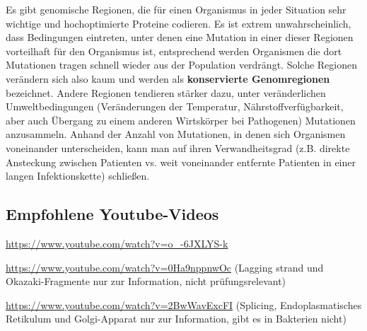 Es gibt genomische Regionen, die für einen Organismus in jeder Situation sehr wichtige und hochoptimierte Proteine codieren. Es ist extrem unwahrscheinlich, dass Bedingungen eintreten, unter denen eine Mutation in einer dieser Regionen vorteilhaft für den Organismus ist, entsprechend werden Organismen die dort Mutationen tragen schnell wieder aus der Population verdrängt. Solche Regionen verändern sich also kaum und werden als \textbf{konservierte Genomregionen} bezeichnet. Andere Regionen tendieren stärker dazu, unter veränderlichen Umweltbedingungen (Veränderungen der Temperatur, Nährstoffverfügbarkeit, aber auch Übergang zu einem anderen Wirtskörper bei Pathogenen) Mutationen anzusammeln. Anhand der Anzahl von Mutationen, in denen sich Organismen voneinander unterscheiden, kann man auf ihren Verwandheitsgrad (z.B. direkte Ansteckung zwischen Patienten vs. weit voneinander entfernte Patienten in einer langen Infektionskette) schließen.

\subsection{Empfohlene Youtube-Videos}
\begin{description}[align=left]
	\item [DNA-Struktur] \href{https://www.youtube.com/watch?v=o\_-6JXLYS-k}{https://www.youtube.com/watch?v=o\_-6JXLYS-k}
	\item [DNA-Replikation] \href{https://www.youtube.com/watch?v=0Ha9nppnwOc}{https://www.youtube.com/watch?v=0Ha9nppnwOc} (Lagging strand und Okazaki-Fragmente nur zur Information, nicht prüfungsrelevant)
	\item [Transkription und Translation] \href{https://www.youtube.com/watch?v=2BwWavExcFI}{https://www.youtube.com/watch?v=2BwWavExcFI} (Splicing, Endoplasmatisches Retikulum und Golgi-Apparat nur zur Information, gibt es in Bakterien nicht)
\end{description}
  
